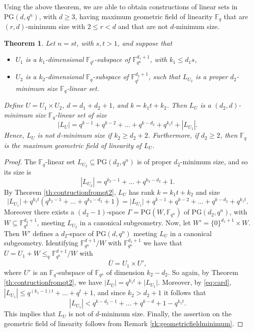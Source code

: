 \documentclass[11pt]{article}
\newtheorem{theorem}{Theorem}[section]
\theoremstyle{definition}
\newcommand{\fqn}{\mathbb{F}_{q^n}}
\newcommand{\F}{{\mathbb F}}
\newcommand{\fq}{{\mathbb F}_{q}}
\newcommand{\PG}{\mathrm{PG}}
\begin{document}
Using the above theorem, we are able to obtain constructions of linear sets in $\PG(d,q^n)$, with $d \geq 3$, having maximum geometric field of linearity $\F_q$ that are $(r,d)$-minimum size with $2 \leq r<d$ and that are not $d$-minimum size.

\begin{theorem} 
 \label{th:constructionnotdminimum}
Let $n=st$, with $s,t>1$, and suppose that
\begin{itemize}
 \item $U_1$ is a $k_1$-dimensional $\F_{q^t}$-subspace of $\fqn^{d_1+1}$, with $k_1 \leq d_1s$,
 \item $U_2$ is a $k_2$-dimensional $\fq$-subspace of $\F_{q^t}^{d_2+1}$, such that $L_{U_2}$ is a proper $d_2$-minimum size $\fq$-linear set.
\end{itemize}
Define $U = U_1 \times U_2$, $d = d_1 + d_2 + 1$, and $k = k_1 t + k_2$.
Then $L_U$ is a $(d_2,d)$-minimum size $\fq$-linear set of size
\[
 |L_U| = q^{k-1} + q^{k-2} + \ldots + q^{k-d_2} + q^{k_1 t} + |L_{U_1}|.
\]
Hence, $L_U$ is not $d$-minimum size if $k_2 \geq d_2+2$.
Furthermore, if $d_2 \geq 2$, then $\fq$ is the maximum geometric field of linearity of $L_U$.
\end{theorem}

\begin{proof}
The $\F_q$-linear set $L_{U_2} \subseteq \PG(d_2,q^n)$ is of proper $d_2$-minimum size, and so its size is 
\[
 |L_{U_2}| = q^{k_2-1}+\ldots+q^{k_2-d_2}+1.
\]
By Theorem \ref{th:contructionfromqt2}, $L_U$ has rank $k=k_1 t + k_2$ and size 
\[
 \lvert L_{U_1} \rvert + q^{k_1 t}(q^{k_2-1}+\ldots+q^{k_2-d_2}+1)
 = \lvert L_{U_1} \rvert + q^{k-1}+q^{k-2}+\ldots+q^{k-d_2}+q^{k_1 t}.
\]
Moreover there exists a $(d_2-1)$-space $\Gamma=\PG(W,\F_{q^n})$ of $\PG(d_2,q^n)$, with $W \subseteq \F_{q^n}^{d_2+1}$, meeting $L_{U_2}$ in a canonical subgeometry.
Now, let $W'=\{0\}^{d_1+1} \times W$.
Then $W'$ defines a $d_2$-space of $\PG(d,q^n)$ meeting $L_U$ in a canonical subgeometry.
Identifying $\F_{q^n}^{d+1}/W$ with $\F_{q^n}^{d_1+1}$ we have that $\overline{U}=U_1+W \leq_q \F_{q^n}^{d+1}/W$ with
\[
\overline{U}=U_1 \times U',
\]
where $U'$ is an $\F_q$-subspace of $\F_{q^n}$ of dimension $k_2-d_2$.
So again, by Theorem \ref{th:contructionfromqt2}, we have $\lvert L_{\overline{U}}\rvert=q^{k_1 t}+\lvert L_{U_1}\rvert$.
Moreover, by \eqref{eq:card}, $|L_{U_1}| \leq q^{(k_1-1)t} + \ldots +q^t+1$, and since $k_2>d_2+1$ it follows that
\[
 |L_{U_1}| < q^{k-d_2-1} + \ldots + q^{k-d} + 1 - q^{k_1 t}.
\]
This implies that $L_U$ is not of $d$-minimum size.
Finally, the assertion on the geometric field of linearity follows from Remark \ref{rk:geometricfieldminimum}.
\end{proof}
\end{document}
